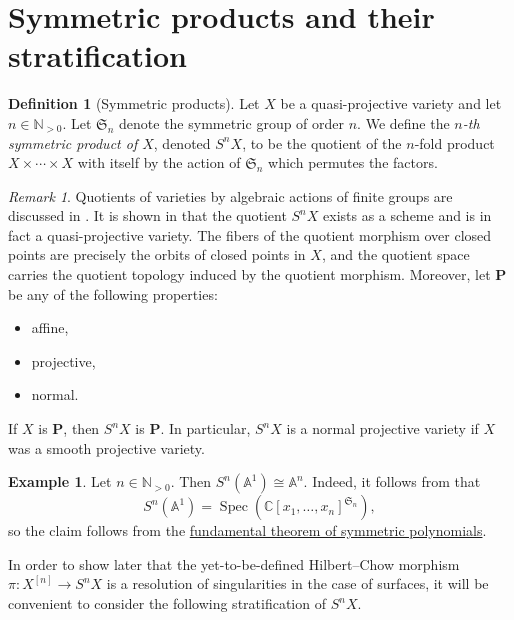 \documentclass[12pt,a4paper]{amsart}
\theoremstyle{plain}
\theoremstyle{definition}
\newtheorem{defn}[thm]{Definition}
\newtheorem{exmp}[thm]{Example}
\theoremstyle{remark}
\newtheorem{rem}[thm]{Remark}
\begin{document}
\section{Symmetric products and their stratification}

\begin{defn}[Symmetric products]
  Let $X$ be a quasi-projective variety and let $n \in \mathbb{N}_{>0}$.
  Let $\mathfrak{S}_{n}$ denote the symmetric group of order $n$.
  We define the \textit{$n$-th symmetric product of $X$}, denoted $S^{n}X$, to be the quotient of the $n$-fold product $X \times \cdots \times X$ with itself by the action of $\mathfrak{S}_{n}$ which permutes the factors.
\end{defn}

\begin{rem}
  Quotients of varieties by algebraic actions of finite groups are discussed in .
  It is shown in  that the quotient $S^{n}X$ exists as a scheme and is in fact a quasi-projective variety.
  The fibers of the quotient morphism over closed points are precisely the orbits of closed points in $X$, and the quotient space carries the quotient topology induced by the quotient morphism.
  Moreover, let $\mathbf{P}$ be any of the following properties:
  \begin{itemize}
    \item affine,
    \item projective,
    \item normal.
  \end{itemize}
  If $X$ is $\mathbf{P}$, then $S^{n}X$ is $\mathbf{P}$.
  In particular, $S^{n}X$ is a normal projective variety if $X$ was a smooth projective variety.
\end{rem}

\begin{exmp}
  Let $n \in \mathbb{N}_{>0}$.
  Then $S^{n}(\mathbb{A}^{1}) \cong \mathbb{A}^{n}$.
  Indeed, it follows from  that
  \[ S^{n}(\mathbb{A}^{1}) = \operatorname{Spec}\left(\mathbb{C}[x_{1}, \ldots, x_{n}]^{\mathfrak{S}_{n}}\right), \]
  so the claim follows from the \href{https://en.wikipedia.org/wiki/Elementary_symmetric_polynomial#Fundamental_theorem_of_symmetric_polynomials}{fundamental theorem of symmetric polynomials}.
\end{exmp}

In order to show later that the yet-to-be-defined Hilbert--Chow morphism $\pi \colon X^{[n]} \to S^{n}X$ is a resolution of singularities in the case of surfaces, it will be convenient to consider the following stratification of $S^{n}X$.
\end{document}
